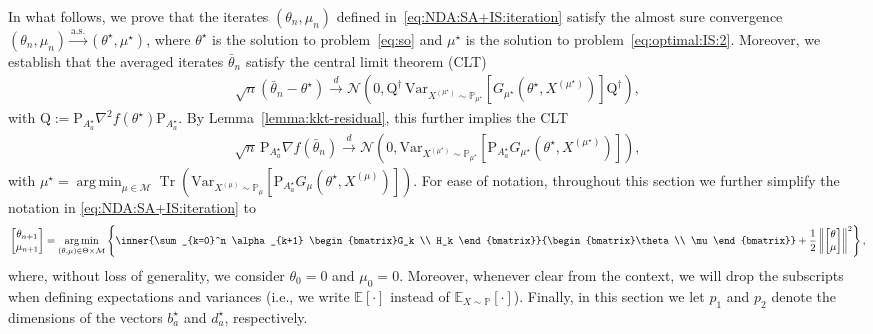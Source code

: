 \documentclass[11pt,a4paper]{article}
\theoremstyle{definition}
\DeclareMathOperator*{\argmin}{arg\,min}
\DeclareMathOperator*{\trace}{Tr}
\begin{document}
In what follows, we prove that the iterates $({\theta}_n, {\mu}_n)$ defined in~\eqref{eq:NDA:SA+IS:iteration} satisfy the almost sure convergence $({\theta}_n, {\mu}_n) \overset{\text{a.s.}}{\to} (\theta^\star,\mu^\star)$, where $\theta^\star$ is the solution to problem~\eqref{eq:so} and $\mu^\star$ is the solution to problem~\eqref{eq:optimal:IS:2}. Moreover, we establish that the averaged iterates $\bar{\theta}_n$ satisfy the central limit theorem (CLT)
\begin{align}
\label{eq:CLT1:conv}
    \sqrt{n}\left( \bar{\theta}_n - \theta^\star \right) \overset{d}{\to} \mathcal N \left(0, \text{Q}^{\dagger}\, \text{Var}_{X^{(\mu^\star)} \sim \mathbb P_{\mu^\star}}\left[G_{\mu^\star}(\theta^\star, X^{(\mu^\star)})\right] \text{Q}^{\dagger} \right),
\end{align}
with $\text{Q}:=\text{P}_{A^\star_{a}}\nabla^2  f(\theta^\star) \text{P}_{A^\star_{a}}$. By Lemma~\ref{lemma:kkt-residual}, this further implies the CLT
\begin{align}
\label{eq:CLT2:conv}
    \sqrt{n}\, \text{P}_{A^\star_{a}} \nabla f(\bar{\theta}_n)  \overset{d}{\to} \mathcal N \left(0, \text{Var}_{X^{(\mu^\star)} \sim \mathbb P_{\mu^\star}}\left[\text{P}_{A^\star_{a}} G_{\mu^\star}(\theta^\star, X^{(\mu^\star)})\right] \right),
\end{align}
with $\mu^\star = \argmin_{\mu \in \mathcal M} \trace\left(\text{Var}_{X^{(\mu)} \sim \mathbb P_\mu}\left[\text{P}_{A^\star_{a}} G_\mu(\theta^\star, X^{(\mu)})\right]\right)$. For ease of notation, throughout this section we further simplify the notation in \eqref{eq:NDA:SA+IS:iteration} to
\begin{align*}
    \begin{bmatrix}\theta_{n+1} \\ \mu_{n+1} \end{bmatrix} = \argmin_{(\theta, \mu) \in \Theta\times \mathcal M} \left\{ \inner{\sum_{k=0}^n \alpha_{k+1} \begin{bmatrix}G_k \\ H_k \end{bmatrix}}{\begin{bmatrix}\theta \\ \mu \end{bmatrix}} +\frac{1}{2} \left\| \begin{bmatrix}\theta \\ \mu \end{bmatrix} \right\|^2\right\},
\end{align*}
where, without loss of generality, we consider $\theta_0 = 0$ and $\mu_0 = 0$. Moreover, whenever clear from the context, we will drop the subscripts when defining expectations and variances (i.e., we write $\mathbb E[\cdot]$ instead of $\mathbb E_{X \sim \mathbb P}[\cdot]$). Finally, in this section we let $p_1$ and $p_2$ denote the dimensions of the vectors $b_a^\star$ and $d_a^\star$, respectively.
\end{document}
